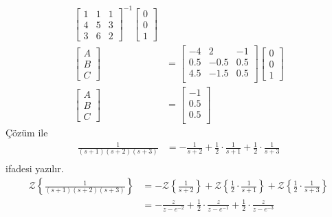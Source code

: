 \begin{enumerate}[\bfseries S1.]
\begin{equation}
\begin{split}
\begin{bmatrix}
            1& 1& 1\\
            4& 5& 3\\
            3& 6& 2
        \end{bmatrix}^{-1}\begin{bmatrix}0\\0\\1\end{bmatrix}\\
        \begin{bmatrix}A\\B\\C\end{bmatrix}&=\begin{bmatrix}
            -4 &   2   &    -1\\
            0.5&   -0.5&    0.5\\
            4.5&   -1.5&    0.5\\
        \end{bmatrix}\begin{bmatrix}0\\0\\1\end{bmatrix}\\
        \begin{bmatrix}A\\B\\C\end{bmatrix}&=\begin{bmatrix}
        -1\\
        0.5\\
        0.5\\
        \end{bmatrix}
        \end{split}
    \end{equation}
    Çözüm ile
    \begin{equation}
        \begin{split}
            \frac{1}{(s+1)(s+2)(s+3)}&=-\frac{1}{s+2}+\frac{1}{2}\cdot\frac{1}{s+1}+\frac{1}{2}\cdot\frac{1}{s+3}\\
        \end{split}
    \end{equation}
    ifadesi yazılır.
    \begin{equation}
        \begin{split}
            \mathcal{Z}\left\{\frac{1}{(s+1)(s+2)(s+3)}\right\}&=
            -\mathcal{Z}\left\{\frac{1}{s+2}\right\}+\mathcal{Z}\left\{\frac{1}{2}\cdot\frac{1}{s+1}\right\}+\mathcal{Z}\left\{\frac{1}{2}\cdot\frac{1}{s+3}\right\}\\
            &=-\frac{z}{z-e^{-2}}+\frac{1}{2}\cdot\frac{z}{z-e^{-1}}+\frac{1}{2}\cdot\frac{z}{z-e^{-3}}
        \end{split}
    \end{equation}

\end{enumerate}
